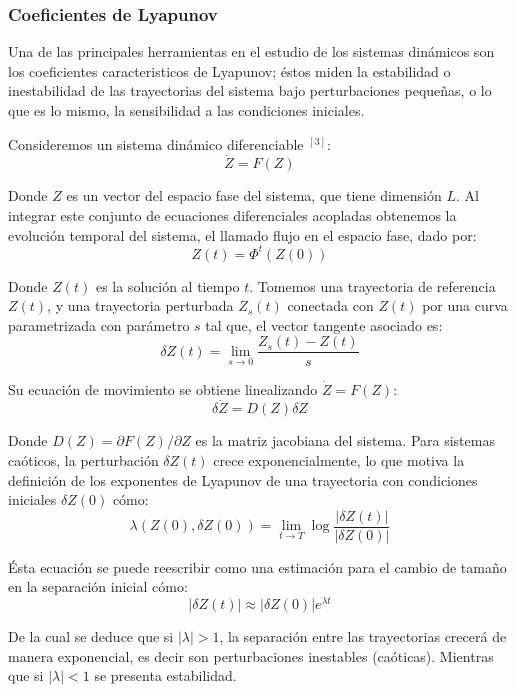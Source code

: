 \documentclass[11pt,letterpaper,twocolumn]{article}
\begin{document}
\subsubsection*{Coeficientes de Lyapunov}
Una de las principales herramientas en el estudio de los sistemas dinámicos son los coeficientes caracteristicos de Lyapunov; éstos miden la estabilidad o inestabilidad de las trayectorias del sistema bajo perturbaciones pequeñas, o lo que es lo mismo, la sensibilidad a las condiciones iniciales.\\
\par 
Consideremos un sistema dinámico diferenciable $^{[3]}$:
$$\dot{Z}=F(Z)$$
\par 
Donde $Z$ es un vector del espacio fase del sistema, que tiene dimensión $L$. Al integrar este conjunto de ecuaciones diferenciales acopladas obtenemos la evolución temporal del sistema, el llamado flujo en el espacio fase, dado por:
$$Z(t)=\Phi^{t}(Z(0))$$
\par
Donde $Z(t)$ es la solución al tiempo $t$. Tomemos una trayectoria de referencia $Z(t)$, y una trayectoria perturbada $Z_{s}(t)$ conectada con $Z(t)$ por una curva parametrizada con parámetro $s$ tal que, el vector tangente asociado es:
$$\delta Z(t)=\lim_{s \to 0}	 \dfrac{Z_{s}(t)-Z(t)}{s}$$
\par 
Su ecuación de movimiento se obtiene linealizando $\dot{Z}=F(Z)$:
$$\delta\dot{Z}=D(Z) \delta Z$$
\par 
Donde $D(Z)= \partial F(Z)/ \partial Z$ es la matriz jacobiana del sistema. Para sistemas caóticos, la perturbación $\delta Z(t)$ crece exponencialmente, lo que motiva la definición de los exponentes de Lyapunov de una trayectoria con condiciones iniciales $\delta Z(0)$ cómo:
$$\lambda (Z(0),\delta Z(0))= \lim_{t \to T} \log \dfrac{\vert \delta Z(t)\vert}{\vert \delta Z(0)\vert}$$
\par 
Ésta ecuación se puede reescribir como una estimación para el cambio de tamaño en la separación inicial cómo:
\begin{equation}
\vert \delta Z(t)\vert \approx \vert \delta Z(0)\vert e^{\lambda t}
\label{coef}
\end{equation}
\par 
De la cual se deduce que si $\vert \lambda \vert > 1$, la separación entre las trayectorias crecerá de manera exponencial, es decir son perturbaciones inestables (caóticas). Mientras que si $\vert \lambda \vert < 1$ se presenta estabilidad. 
\end{document}
